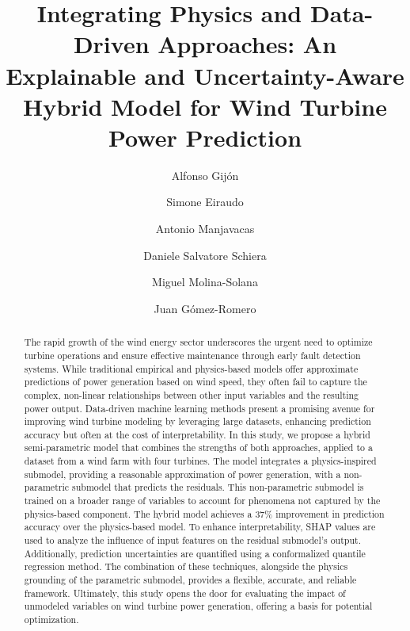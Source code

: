 \documentclass[preprint,12pt]{elsarticle}
\begin{document}
\begin{frontmatter}


\title{Integrating Physics and Data-Driven Approaches: An Explainable and  Uncertainty-Aware Hybrid Model for Wind Turbine Power Prediction}

\author[granada,cordoba]{Alfonso Gijón}
\author[poli]{Simone Eiraudo}
\author[granada]{Antonio Manjavacas}
\author[poli]{Daniele Salvatore Schiera}
\author[granada]{Miguel Molina-Solana}
\author[granada]{Juan Gómez-Romero}





\begin{abstract}
The rapid growth of the wind energy sector underscores the urgent need to optimize turbine operations and ensure effective maintenance through early fault detection systems. While traditional empirical and physics-based models offer approximate predictions of power generation based on wind speed, they often fail to capture the complex, non-linear relationships between other input variables and the resulting power output. Data-driven machine learning methods present a promising avenue for improving wind turbine modeling by leveraging large datasets, enhancing prediction accuracy but often at the cost of interpretability. In this study, we propose a hybrid semi-parametric model that combines the strengths of both approaches, applied to a dataset from a wind farm with four turbines. The model integrates a physics-inspired submodel, providing a reasonable approximation of power generation, with a non-parametric submodel that predicts the residuals. This non-parametric submodel is trained on a broader range of variables to account for phenomena not captured by the physics-based component. The hybrid model achieves a 37\% improvement in prediction accuracy over the physics-based model. To enhance interpretability, SHAP values are used to analyze the influence of input features on the residual submodel's output. Additionally, prediction uncertainties are quantified using a conformalized quantile regression method. The combination of these techniques, alongside the physics grounding of the parametric submodel, provides a flexible, accurate, and reliable framework. Ultimately, this study opens the door for evaluating the impact of unmodeled variables on wind turbine power generation, offering a basis for potential optimization.
\end{abstract}


\end{frontmatter}
\end{document}
